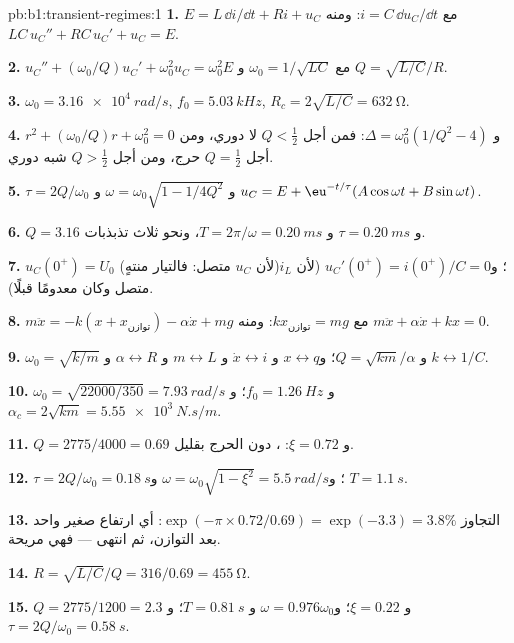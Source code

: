\begin{solution}{pb:b1:transient-regimes:1}
\textbf{1.} $E = L\,\dd i/\dd t + Ri + u_C$ مع $i = C\,\dd u_C/\dd t$:
ومنه $LC\,u_C'' + RC\,u_C' + u_C = E$.

\textbf{2.} $u_C'' + (\omega_0/Q)u_C' + \omega_0^2u_C = \omega_0^2E$ مع
$\omega_0 = 1/\sqrt{LC}$ و $Q = \sqrt{L/C}/R$.

\textbf{3.} $\omega_0 = \qty{3.16e4}{rad/s}$, $f_0 = \qty{5.03}{kHz}$,
$R_c = 2\sqrt{L/C} = \qty{632}{\ohm}$.

\textbf{4.} $r^2 + (\omega_0/Q)r + \omega_0^2 = 0$ و $\Delta = \omega_0^2(1/Q^2
- 4)$: فمن أجل $Q < \tfrac12$ لا دوري، ومن أجل $Q = \tfrac12$ حرج، ومن أجل $Q > \tfrac12$
شبه دوري.

\textbf{5.} $\tau = 2Q/\omega_0$ و $\omega = \omega_0\sqrt{1 - 1/4Q^2}$ و
$u_C = E + \eu^{-t/\tau}(A\cos\omega t + B\sin\omega t)$.

\textbf{6.} $Q = 3.16$ و $\tau = \qty{0.20}{ms}$ و $T = 2\pi/\omega =
\qty{0.20}{ms}$، ونحو ثلاث تذبذبات.

\textbf{7.} $u_C(0^+) = U_0$ (لأن $u_C$ متصل: فالتيار منتهٍ)؛
و$u_C'(0^+) = i(0^+)/C = 0$ (لأن $i_L$ متصل وكان معدومًا قبلًا).

\textbf{8.} $m\ddot x = -k(x + x_{\text{توازن}}) - \alpha\dot x + mg$ مع
$kx_{\text{توازن}} = mg$: ومنه $m\ddot x + \alpha\dot x + kx = 0$.

\textbf{9.} $\omega_0 = \sqrt{k/m}$ و $Q = \sqrt{km}/\alpha$؛ و$x \leftrightarrow
q$ و $\dot x \leftrightarrow i$ و $m \leftrightarrow L$ و $\alpha \leftrightarrow
R$ و $k \leftrightarrow 1/C$.

\textbf{10.} $\omega_0 = \sqrt{22000/350} = \qty{7.93}{rad/s}$ و $f_0 =
\qty{1.26}{Hz}$؛ و$\alpha_c = 2\sqrt{km} = \qty{5.55e3}{N.s/m}$.

\textbf{11.} $Q = 2775/4000 = 0.69$ و $\xi = 0.72$: ، دون
الحرج بقليل.

\textbf{12.} $\tau = 2Q/\omega_0 = \qty{0.18}{s}$؛ و$\omega = \omega_0\sqrt{1
- \xi^2} = \qty{5.5}{rad/s}$ و $T = \qty{1.1}{s}$.

\textbf{13.} التجاوز $\exp(-\pi \times 0.72/0.69) = \exp(-3.3) = 3.8\%$:
أي ارتفاع صغير واحد بعد التوازن، ثم انتهى --- فهي مريحة.

\textbf{14.} $R = \sqrt{L/C}/Q = 316/0.69 = \qty{455}{\ohm}$.

\textbf{15.} $Q = 2775/1200 = 2.3$ و $\xi = 0.22$؛ و$\omega = 0.976\omega_0$ و
$T = \qty{0.81}{s}$؛ و$\tau = 2Q/\omega_0 = \qty{0.58}{s}$.


\end{solution}

